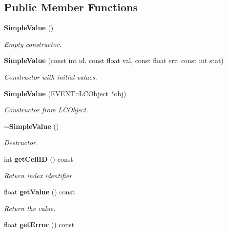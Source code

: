 \subsection*{Public Member Functions}
\begin{DoxyCompactItemize}
\item 
{\bf Simple\-Value} ()\label{classCALICE_1_1SimpleValue_ab63afbd0e34d1f5de34ba7f0301f6f84}

\begin{DoxyCompactList}\small\item\em Empty constructor. \end{DoxyCompactList}\item 
{\bf Simple\-Value} (const int id, const float val, const float err, const int stat)\label{classCALICE_1_1SimpleValue_ae5c7759090b4235eddfed2ea6b977e40}

\begin{DoxyCompactList}\small\item\em Constructor with initial values. \end{DoxyCompactList}\item 
{\bf Simple\-Value} (E\-V\-E\-N\-T\-::\-L\-C\-Object $\ast$obj)\label{classCALICE_1_1SimpleValue_a3d8634f99881f9481572b16a5e2bffda}

\begin{DoxyCompactList}\small\item\em Constructor from L\-C\-Object. \end{DoxyCompactList}\item 
{\bf $\sim$\-Simple\-Value} ()\label{classCALICE_1_1SimpleValue_a9027e479b382b6a6e9371a4dff09bdaa}

\begin{DoxyCompactList}\small\item\em Destructor. \end{DoxyCompactList}\item 
int {\bf get\-Cell\-I\-D} () const \label{classCALICE_1_1SimpleValue_a9cb25f2d1419faa25ee60ee6969088f2}

\begin{DoxyCompactList}\small\item\em Return index identifier. \end{DoxyCompactList}\item 
float {\bf get\-Value} () const \label{classCALICE_1_1SimpleValue_a10ed251ac01eeb6b7c7c630eb419e86b}

\begin{DoxyCompactList}\small\item\em Return the value. \end{DoxyCompactList}\item 
float {\bf get\-Error} () const \label{classCALICE_1_1SimpleValue_aac126ec03ca714db24176742edf86a5c}


\end{DoxyCompactItemize}

